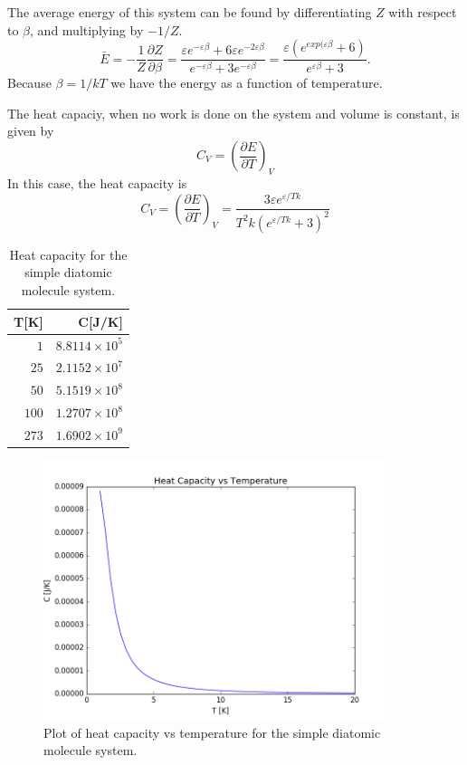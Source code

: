 \documentclass[10pt,a4paper]{amsart}
\begin{document}
The average energy of this system can be found by differentiating $Z$ with respect to $\beta$, and multiplying by $-1/Z$.
\begin{equation}
\bar{E} = -\frac{1}{Z}\frac{\partial Z}{\partial \beta}=
\frac{\varepsilon e^{-\varepsilon\beta}+6\varepsilon e^{-2\varepsilon\beta} }{e^{-\varepsilon\beta} + 3e^{-\varepsilon\beta}} = \frac{\varepsilon(e^{exp(\varepsilon\beta}+6)}{e^{\varepsilon\beta}+3}.
\end{equation}
Because $\beta = 1/kT$ we have the energy as a function of temperature.

The heat capaciy, when no work is done on the system and volume is constant, is given by
\begin{equation}
C_V = \left(\frac{\partial E}{\partial T} \right)_V
\end{equation}
In this case, the heat capacity is 
\begin{equation*}
C_V =\left(\frac{\partial E}{\partial T} \right)_V =
\frac{3\varepsilon e^{\varepsilon/Tk}}{T^2k(e^{\varepsilon/Tk}+3)^2}
\end{equation*}

\begin{table}[H]
	\caption{Heat capacity for the simple diatomic molecule system.}
	\begin{tabular}{rr} \hline
	T[K]  & C[J/K] \\ \hline 
	$  1$ & $8.8114\times10^5$ \\
	$ 25$ & $2.1152\times10^7$ \\
	$ 50$ & $5.1519\times10^8$ \\
	$100$ & $1.2707\times10^8$ \\
	$273$ & $1.6902\times10^9$ \\ \hline
	\end{tabular}
	\label{tab:heatcap1}
\end{table}

\begin{figure}[H]
	\includegraphics[width=0.9\textwidth]{figures/heatcapsimple.png}
	\caption{Plot of heat capacity vs temperature for the simple 			diatomic molecule system.}
	\label{fig:heatcap1}
\end{figure}
\end{document}
